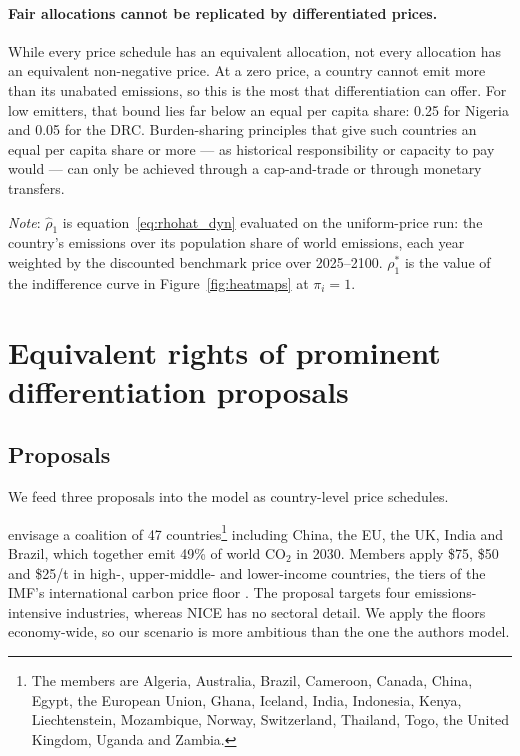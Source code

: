 \documentclass[12pt,english]{article}
\theoremstyle{remark}
\begin{document}
\paragraph{Fair allocations cannot be replicated by differentiated prices.}
While every price schedule has an equivalent allocation, not every allocation has an equivalent non-negative price. At a zero price, a country cannot emit more than its unabated emissions, so this is the most that differentiation can offer.
For low emitters, that bound lies far below an equal per capita share: 0.25 for Nigeria and 0.05 for the DRC.
Burden-sharing principles that give such countries an equal per capita share or more --- as historical responsibility or capacity to pay would --- can only be achieved through a cap-and-trade or through monetary transfers.

\begin{table}[tbp]
\centering
\small
\singlespacing
\begin{threeparttable}
\caption{Allocation at which each country is indifferent when the autarky price equals the benchmark ($\pi_i=1$).}
\label{tab:summary}
\begin{tablenotes}\footnotesize
  \item \emph{Note}: $\hat\rho_1$ is equation~\eqref{eq:rhohat_dyn} evaluated on the uniform-price run: the country's emissions over its population share of world emissions, each year weighted by the discounted benchmark price over 2025--2100. $\rho^*_1$ is the value of the indifference curve in Figure~\ref{fig:heatmaps} at $\pi_i = 1$.
\end{tablenotes}
\end{threeparttable}
\end{table}

\section{Equivalent rights of prominent differentiation proposals}
\label{sec:proposals}

\subsection{Proposals}

We feed three proposals into the model as country-level price schedules.

\citet{wolfram_building_2025} envisage a coalition of 47 countries\footnote{The members are Algeria, Australia, Brazil, Cameroon, Canada, China, Egypt, the European Union, Ghana, Iceland, India, Indonesia, Kenya, Liechtenstein, Mozambique, Norway, Switzerland, Thailand, Togo, the United Kingdom, Uganda and Zambia.} including China, the EU, the UK, India and Brazil, which together emit 49\% of world CO$_2$ in 2030. Members apply \$75, \$50 and \$25/t in high-, upper-middle- and lower-income countries, the tiers of the IMF's international carbon price floor \citep{parry_proposal_2021}. The proposal targets four emissions-intensive industries, whereas NICE has no sectoral detail. We apply the floors economy-wide, so our scenario is more ambitious than the one the authors model.
\end{document}
